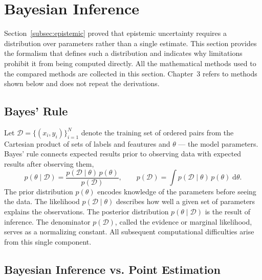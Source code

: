 \section{Bayesian Inference}
\label{sec:bayesian-inference}

Section~\ref{subsec:epistemic} proved that epistemic uncertainty requires a
distribution over parameters rather than a single estimate. This section provides the
formalism that defines such a distribution and indicates why limitations prohibit it from being computed directly. All the mathematical methods used to the compared methods are collected in this section. Chapter~3 refers to methods shown below and does not repeat the derivations.

\subsection{Bayes' Rule}
\label{subsec:bayes-rule}

Let $\mathcal{D} = \{(x_i, y_i)\}_{i=1}^{N}$ denote the training set of ordered pairs from the Cartesian product of sets of labels and feautures and $\theta$ --- the model parameters. Bayes' rule connects expected results prior to observing data with expected results after observing them,
%
\begin{equation}
    p(\theta \mid \mathcal{D})
    = \frac{p(\mathcal{D} \mid \theta)\, p(\theta)}{p(\mathcal{D})},
    \qquad
    p(\mathcal{D}) = \int p(\mathcal{D} \mid \theta)\, p(\theta)\; \mathrm{d}\theta .
    \label{eq:bayes-rule}
\end{equation}
%
The prior distribution $p(\theta)$ encodes knowledge of the parameters before seeing the
data. The likelihood $p(\mathcal{D} \mid \theta)$ describes how well a given set of
parameters explains the observations. The posterior distribution $p(\theta \mid \mathcal{D})$
is the result of inference. The denominator $p(\mathcal{D})$, called the evidence or
marginal likelihood, serves as a normalizing constant. All subsequent computational
difficulties arise from this single component.

\subsection{Bayesian Inference vs. Point Estimation}
\label{subsec:mle-map}

